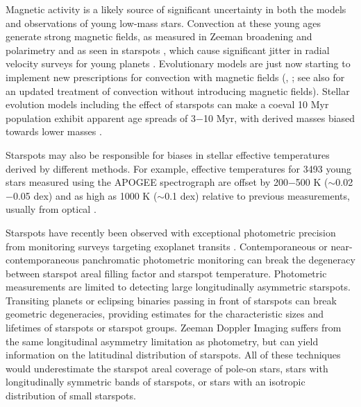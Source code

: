 \documentclass[twocolumn]{emulateapj}%
\begin{document}
Magnetic activity is a likely source of significant uncertainty in both the models and observations of young low-mass stars. Convection at these young ages generate strong magnetic fields, as measured in Zeeman broadening and polarimetry \citep[e.g.][]{johnskrull07,donati09} and as seen in starspots \citep[e.g.][]{stauffer03,grankin08}, which cause significant jitter in radial velocity surveys for young planets \citep[e.g.][]{donati14, robertson14}.  Evolutionary models are just now starting to implement new prescriptions for convection with magnetic fields (\citet{somers15}, \citet{feiden16}; see also \citet{baraffe15} for an updated treatment of convection without introducing magnetic fields).  Stellar evolution models including the effect of starspots can make a coeval 10 Myr population exhibit apparent age spreads of 3$-$10 Myr, with derived masses biased towards lower masses \citep{somers15}.  

Starspots may also be responsible for biases in stellar effective temperatures derived by different methods.  For example, effective temperatures for 3493 young stars measured using the APOGEE spectrograph \citep[$1.5-1.70 \;\mu$m at $R=22,500$][]{wilson10} are offset by 200$-$500 K ($\sim$0.02$-$0.05 dex) and as high as 1000 K ($\sim$0.1 dex) relative to previous measurements, usually from optical \citep{cottaar14}.  



Starspots have recently been observed with exceptional photometric precision from monitoring surveys targeting exoplanet transits \citep{harrison11,davenport15}.  Contemporaneous or near-contemporaneous panchromatic photometric monitoring \citep{bouvier95,grankin07} can break the degeneracy between starspot areal filling factor and starspot temperature. Photometric measurements are limited to detecting large longitudinally asymmetric starspots.  Transiting planets or eclipsing binaries passing in front of starspots \citep{desert11} can break geometric degeneracies, providing estimates for the characteristic sizes and lifetimes of starspots or starspot groups.  Zeeman Doppler Imaging \citep[ZDI]{donati14} suffers from the same longitudinal asymmetry limitation as photometry, but can yield information on the latitudinal distribution of starspots.  All of these techniques would underestimate the starspot areal coverage of pole-on stars, stars with longitudinally symmetric bands of starspots, or stars with an isotropic distribution of small starspots.  
\end{document}
